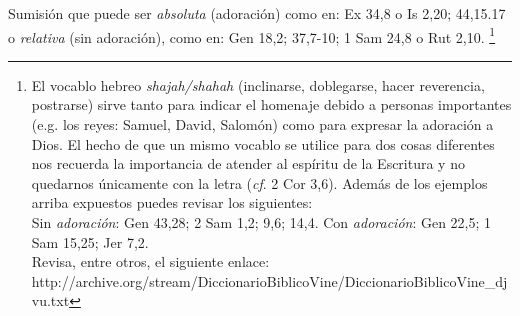 \documentclass{article}
\begin{document}
Sumisi\'on que puede ser \emph{absoluta} (adoraci\'on) como en: Ex 34,8 o Is 2,20; 44,15.17 o \emph{relativa} (sin adoraci\'on), como en: Gen 18,2; 37,7-10; 1 Sam 24,8 o Rut 2,10.%
    \footnote{El vocablo hebreo \emph{shajah/shahah} (inclinarse, doblegarse, hacer reverencia, postrarse) sirve tanto para indicar el homenaje debido a personas importantes (e.g. los reyes: Samuel, David, Salom\'on) como para expresar la adoraci\'on a Dios. El hecho de que un mismo vocablo se utilice para dos cosas diferentes nos recuerda la importancia de atender al esp\'{i}ritu de la Escritura y no quedarnos \'unicamente con la letra (\emph{cf}. 2 Cor 3,6). Adem\'as de los ejemplos arriba expuestos puedes revisar los siguientes:\\ Sin \emph{adoraci\'on}: Gen 43,28; 2 Sam 1,2; 9,6; 14,4. Con \emph{adoraci\'on}: Gen 22,5; 1 Sam 15,25; Jer 7,2.\\ Revisa, entre otros, el siguiente enlace: http://archive.org/stream/DiccionarioBiblicoVine/DiccionarioBiblicoVine\_djvu.txt}
\end{document}
